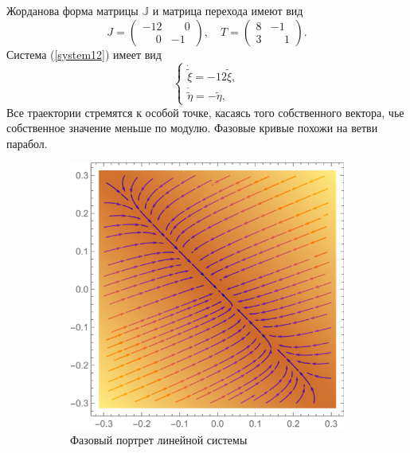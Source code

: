 \documentclass[12pt, a4paper]{article}
\begin{document}
\begin{enumerate}
Жорданова форма матрицы $\mathbb{J}$ и матрица перехода имеют вид
\[
J=\begin{pmatrix}
	-12 & \phantom{-}0 \\
	\phantom{-}0 & -1
\end{pmatrix},
\quad
T=\begin{pmatrix}
	8 & -1 \\
	3 & \phantom{-}1
\end{pmatrix}.
\]
Система (\ref{system12}) имеет вид
\[
\begin{cases}
	\dot{\tilde{\xi}}=-12\tilde{\xi},\\
	\dot{\tilde{\eta}}=-\tilde{\eta},
\end{cases}
\]
 Все траектории стремятся к особой точке, касаясь того собственного вектора, чье собственное значение меньше по модулю. Фазовые кривые похожи на ветви парабол.
 	\begin{figure}[H]
 	\centering
 	\begin{subfigure}[H]{0.4\textwidth}
 		\includegraphics[width=\textwidth]{p1_1_1}
 		\caption{Фазовый портрет линейной системы}
 		\label{oldfazov}
 	\end{subfigure}
 	\qquad\qquad
 	\begin{subfigure}[H]{0.4\textwidth}

\end{subfigure}
\end{figure}
\end{enumerate}
\end{document}
